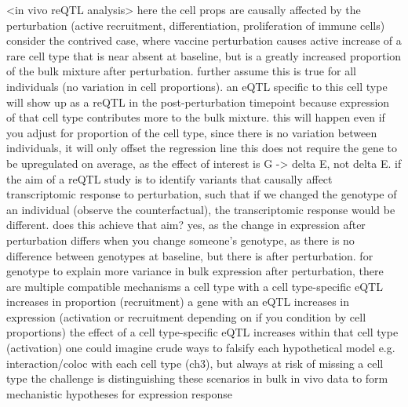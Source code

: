 \begin{outline}
\1 <in vivo reQTL analysis>
    \2 here the cell props are causally affected by the perturbation (active recruitment, differentiation, proliferation of immune cells)
    \2 consider the contrived case, where vaccine perturbation causes active increase of a rare cell type that is near absent at baseline, but is a greatly increased proportion of the bulk mixture after perturbation.
    \2 further assume this is true for all individuals (no variation in cell proportions).
    \2 an eQTL specific to this cell type will show up as a reQTL in the post-perturbation timepoint because expression of that cell type contributes more to the bulk mixture.
        \3 this will happen even if you adjust for proportion of the cell type, since there is no variation between individuals, it will only offset the regression line
        \3 this does not require the gene to be upregulated on average, as the effect of interest is G -> delta E, not delta E.
    \2 if the aim of a reQTL study is to identify variants that causally affect transcriptomic response to perturbation, 
        such that if we changed the genotype of an individual (observe the counterfactual), the transcriptomic response would be different.
    \2 does this achieve that aim? 
        yes, as the change in expression after perturbation differs when you change someone's genotype,
        as there is no difference between genotypes at baseline,
        but there is after perturbation.
    \2 for genotype to explain more variance in bulk expression after perturbation, there are multiple compatible mechanisms
        \3 a cell type with a cell type-specific eQTL increases in proportion (recruitment) 
        \3 a gene with an eQTL increases in expression (activation or recruitment depending on if you condition by cell proportions)
        \3 the effect of a cell type-specific eQTL increases within that cell type (activation)
    \2 one could imagine crude ways to falsify each hypothetical model e.g. interaction/coloc with each cell type (ch3), but always at risk of missing a cell type
    \2 the challenge is distinguishing these scenarios in bulk in vivo data to form mechanistic hypotheses for expression response


\end{outline}
